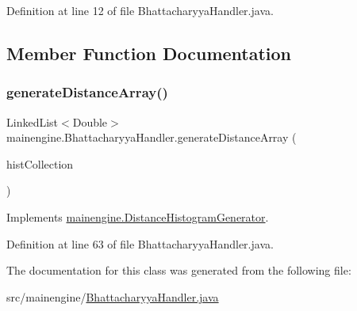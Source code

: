 Definition at line 12 of file Bhattacharyya\+Handler.\+java.



\subsection{Member Function Documentation}
\hypertarget{classmainengine_1_1_bhattacharyya_handler_aaf0d9ca0ecc056d53a2f6f42f41e0b99}{}\label{classmainengine_1_1_bhattacharyya_handler_aaf0d9ca0ecc056d53a2f6f42f41e0b99} 
\subsubsection{\texorpdfstring{generate\+Distance\+Array()}{generateDistanceArray()}}
{\footnotesize\ttfamily Linked\+List$<$Double$>$ mainengine.\+Bhattacharyya\+Handler.\+generate\+Distance\+Array (\begin{DoxyParamCaption}\item[{Linked\+List$<$ Mat $>$}]{hist\+Collection }\end{DoxyParamCaption})}



Implements \hyperlink{interfacemainengine_1_1_distance_histogram_generator_aae0fe15938495eb06c17644291eb099a}{mainengine.\+Distance\+Histogram\+Generator}.



Definition at line 63 of file Bhattacharyya\+Handler.\+java.



The documentation for this class was generated from the following file\+:\begin{DoxyCompactItemize}
\item 
src/mainengine/\hyperlink{_bhattacharyya_handler_8java}{Bhattacharyya\+Handler.\+java}\end{DoxyCompactItemize}
